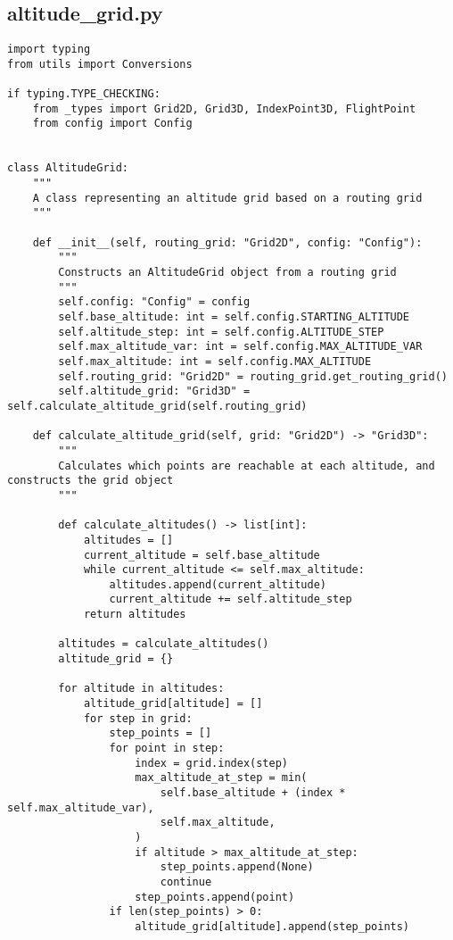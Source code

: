 \subsection{altitude_grid.py}
\begin{verbatim}
import typing
from utils import Conversions

if typing.TYPE_CHECKING:
    from _types import Grid2D, Grid3D, IndexPoint3D, FlightPoint
    from config import Config


class AltitudeGrid:
    """
    A class representing an altitude grid based on a routing grid
    """

    def __init__(self, routing_grid: "Grid2D", config: "Config"):
        """
        Constructs an AltitudeGrid object from a routing grid
        """
        self.config: "Config" = config
        self.base_altitude: int = self.config.STARTING_ALTITUDE
        self.altitude_step: int = self.config.ALTITUDE_STEP
        self.max_altitude_var: int = self.config.MAX_ALTITUDE_VAR
        self.max_altitude: int = self.config.MAX_ALTITUDE
        self.routing_grid: "Grid2D" = routing_grid.get_routing_grid()
        self.altitude_grid: "Grid3D" = self.calculate_altitude_grid(self.routing_grid)

    def calculate_altitude_grid(self, grid: "Grid2D") -> "Grid3D":
        """
        Calculates which points are reachable at each altitude, and constructs the grid object
        """

        def calculate_altitudes() -> list[int]:
            altitudes = []
            current_altitude = self.base_altitude
            while current_altitude <= self.max_altitude:
                altitudes.append(current_altitude)
                current_altitude += self.altitude_step
            return altitudes

        altitudes = calculate_altitudes()
        altitude_grid = {}

        for altitude in altitudes:
            altitude_grid[altitude] = []
            for step in grid:
                step_points = []
                for point in step:
                    index = grid.index(step)
                    max_altitude_at_step = min(
                        self.base_altitude + (index * self.max_altitude_var),
                        self.max_altitude,
                    )
                    if altitude > max_altitude_at_step:
                        step_points.append(None)
                        continue
                    step_points.append(point)
                if len(step_points) > 0:
                    altitude_grid[altitude].append(step_points)


\end{verbatim}
